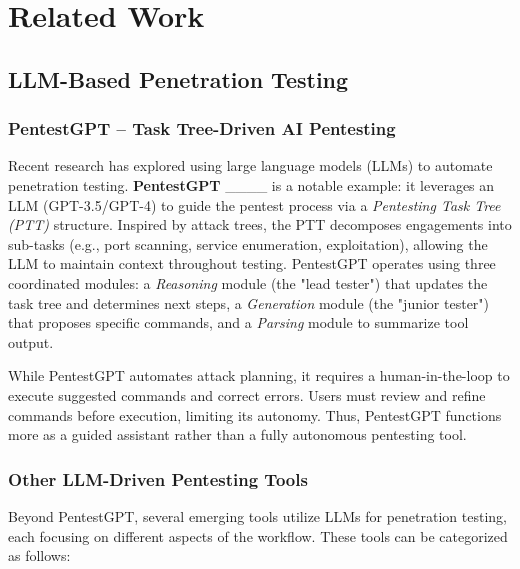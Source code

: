 \section{Related Work}
\label{sec:relatedwork}

\subsection{LLM-Based Penetration Testing}

\subsubsection{PentestGPT – Task Tree-Driven AI Pentesting}
Recent research has explored using large language models (LLMs) to automate penetration testing. \textbf{PentestGPT} ____ is a notable example: it leverages an LLM (GPT-3.5/GPT-4) to guide the pentest process via a \textit{Pentesting Task Tree (PTT)} structure. Inspired by attack trees, the PTT decomposes engagements into sub-tasks (e.g., port scanning, service enumeration, exploitation), allowing the LLM to maintain context throughout testing. PentestGPT operates using three coordinated modules: a \emph{Reasoning} module (the "lead tester") that updates the task tree and determines next steps, a \emph{Generation} module (the "junior tester") that proposes specific commands, and a \emph{Parsing} module to summarize tool output.

While PentestGPT automates attack planning, it requires a human-in-the-loop to execute suggested commands and correct errors. Users must review and refine commands before execution, limiting its autonomy. Thus, PentestGPT functions more as a guided assistant rather than a fully autonomous pentesting tool.

\subsubsection{Other LLM-Driven Pentesting Tools}
Beyond PentestGPT, several emerging tools utilize LLMs for penetration testing, each focusing on different aspects of the workflow. These tools can be categorized as follows:

